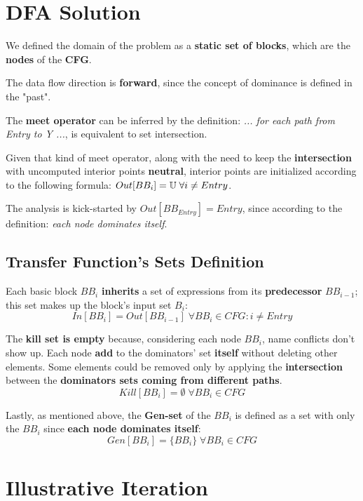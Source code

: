 \documentclass[a4paper,12pt,numbers=noenddot]{scrreprt}
\begin{document}
    \section*{DFA Solution}
    
        We defined the domain of the problem as a \textbf{static set of blocks}, which are the \textbf{nodes} of the \textbf{CFG}.
        
        The data flow direction is \textbf{forward}, since the concept of dominance is defined in the "past".
        
        The \textbf{meet operator} can be inferred by the definition: \textit{... for each path from Entry to Y ...}, is equivalent to set intersection.
        
        Given that kind of meet operator, along with the need to keep the \textbf{intersection} with uncomputed interior points \textbf{neutral}, interior points are initialized according to the following formula: 
        $Out[BB_i] = \mathbb{U} \space \; \forall i \neq Entry$.
        
        The analysis is kick-started by $Out[BB_{Entry}] = Entry$, since according to the definition: \textit{each node dominates itself}.

        \subsection*{Transfer Function's Sets Definition}
        
            Each basic block $BB_i$ \textbf{inherits} a set of expressions from its \textbf{predecessor} $BB_{i-1}$; this set makes up the block's input set $B_i$: $$In[BB_i] = Out[BB_{i-1}] \; \forall BB_i \in CFG : i \neq Entry$$
        
            The \textbf{kill set is empty} because, considering each node $BB_i$, name conflicts don't show up. Each node \textbf{add} to the dominators' set \textbf{itself} without deleting other elements. Some elements could be removed only by applying the \textbf{intersection} between the \textbf{dominators sets coming from different paths}.  $$Kill[BB_i] = \emptyset \; \forall BB_i \in CFG$$

            Lastly, as mentioned above, the \textbf{Gen-set} of the $BB_i$ is defined as a set with only the $BB_i$ since \textbf{each node dominates itself}: $$Gen[BB_i] = \{ BB_i \} \; \forall BB_i \in CFG$$ 

    \section*{Illustrative Iteration}
\end{document}
